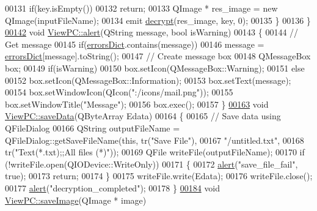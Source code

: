 \begin{DoxyCode}
00131         \textcolor{keywordflow}{if}(key.isEmpty())
00132             \textcolor{keywordflow}{return};
00133         QImage * res\_image = \textcolor{keyword}{new} QImage(inputFileName);
00134         emit \hyperlink{class_view_p_c_a365df051360d557c7221474ad856e0af}{decrypt}(res\_image, key, 0);
00135     \}
00136 \}
\hypertarget{viewpc_8cpp_source.tex_l00142}{}\hyperlink{class_view_p_c_a7c467169467789561078abc9d4fe57bd}{00142} \textcolor{keywordtype}{void} \hyperlink{class_view_p_c_a7c467169467789561078abc9d4fe57bd}{ViewPC::alert}(QString message, \textcolor{keywordtype}{bool} isWarning)
00143 \{
00144     \textcolor{comment}{// Get message}
00145     \textcolor{keywordflow}{if}(\hyperlink{class_view_p_c_a26f90436aca32e5bad46f5e69a7e7e09}{errorsDict}.contains(message))
00146         message = \hyperlink{class_view_p_c_a26f90436aca32e5bad46f5e69a7e7e09}{errorsDict}[message].toString();
00147     \textcolor{comment}{// Create message box}
00148     QMessageBox box;
00149     \textcolor{keywordflow}{if}(isWarning)
00150         box.setIcon(QMessageBox::Warning);
00151     \textcolor{keywordflow}{else}
00152         box.setIcon(QMessageBox::Information);
00153     box.setText(message);
00154     box.setWindowIcon(QIcon(\textcolor{stringliteral}{":/icons/mail.png"}));
00155     box.setWindowTitle(\textcolor{stringliteral}{"Message"});
00156     box.exec();
00157 \}
\hypertarget{viewpc_8cpp_source.tex_l00163}{}\hyperlink{class_view_p_c_aaff156103970be7c777beedaf0020604}{00163} \textcolor{keywordtype}{void} \hyperlink{class_view_p_c_aaff156103970be7c777beedaf0020604}{ViewPC::saveData}(QByteArray Edata)
00164 \{
00165     \textcolor{comment}{// Save data using QFileDialog}
00166     QString outputFileName = QFileDialog::getSaveFileName(\textcolor{keyword}{this}, tr(\textcolor{stringliteral}{"Save File"}),
00167                                \textcolor{stringliteral}{"/untitled.txt"},
00168                                tr(\textcolor{stringliteral}{"Text(*.txt);;All files (*)"}));
00169     QFile writeFile(outputFileName);
00170     \textcolor{keywordflow}{if} (!writeFile.open(QIODevice::WriteOnly))
00171     \{
00172         \hyperlink{class_view_p_c_a7c467169467789561078abc9d4fe57bd}{alert}(\textcolor{stringliteral}{"save\_file\_fail"}, \textcolor{keyword}{true});
00173         \textcolor{keywordflow}{return};
00174     \}
00175     writeFile.write(Edata);
00176     writeFile.close();
00177     \hyperlink{class_view_p_c_a7c467169467789561078abc9d4fe57bd}{alert}(\textcolor{stringliteral}{"decryption\_completed"});
00178 \}
\hypertarget{viewpc_8cpp_source.tex_l00184}{}\hyperlink{class_view_p_c_a7901ce10ffaaf2387bef1db7feea342d}{00184} \textcolor{keywordtype}{void} \hyperlink{class_view_p_c_a7901ce10ffaaf2387bef1db7feea342d}{ViewPC::saveImage}(QImage * image)

\end{DoxyCode}
